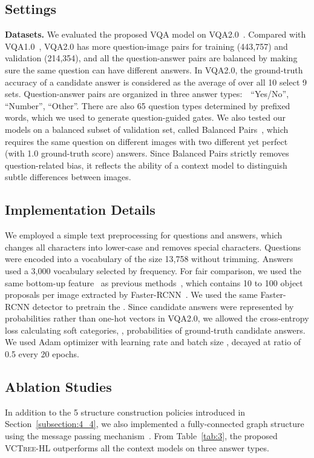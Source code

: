 \documentclass[10pt,twocolumn,letterpaper]{article}
\begin{document}
\subsection{Settings}
\noindent\textbf{Datasets.}
We evaluated the proposed VQA model on VQA2.0~\cite{goyal2017making}. Compared with VQA1.0~\cite{antol2015vqa}, VQA2.0 has more question-image pairs for training (443,757) and validation (214,354), and all the question-answer pairs are balanced by making sure the same question can have different answers. In VQA2.0, the ground-truth accuracy of a candidate answer is considered as the average of  over all 10 select 9 sets. Question-answer pairs are organized in three answer types:~\ie~``Yes/No'', ``Number'', ``Other''. There are also 65 question types determined by prefixed words, which we used to generate question-guided gates. We also tested our models on a balanced subset of validation set, called Balanced Pairs~\cite{Teney_2018_CVPR}, which requires the same question on different images with two different yet perfect (with 1.0 ground-truth score) answers. Since Balanced Pairs strictly removes question-related bias, it reflects the ability of a context model to distinguish subtle differences between images.

\subsection{Implementation Details}
We employed a simple text preprocessing for questions and answers, which changes all characters into lower-case and removes special characters. Questions were encoded into a vocabulary of the size 13,758 without trimming. Answers used a 3,000 vocabulary selected by frequency. For fair comparison, we used the same bottom-up feature~\cite{anderson2018bottom} as previous methods~\cite{anderson2018bottom, bai2018deep, Teney_2018_CVPR, zhang2018learning}, which contains 10 to 100 object proposals per image extracted by Faster-RCNN~\cite{ren2015faster}. We used the same Faster-RCNN detector to pretrain the . Since candidate answers were represented by probabilities rather than one-hot vectors in VQA2.0, we allowed the cross-entropy loss calculating soft categories, \ie, probabilities of ground-truth candidate answers. We used Adam optimizer with learning rate  and batch size ,  decayed at ratio of 0.5 every 20 epochs. 



\subsection{Ablation Studies}
In addition to the 5 structure construction policies introduced in Section~\ref{subsection:4_4}, we also implemented a fully-connected graph structure using the message passing mechanism~\cite{xu2017scene}. From Table~\ref{tab:3}, the proposed \textsc{VCTree}-HL outperforms all the context models on three answer types. 
\end{document}
